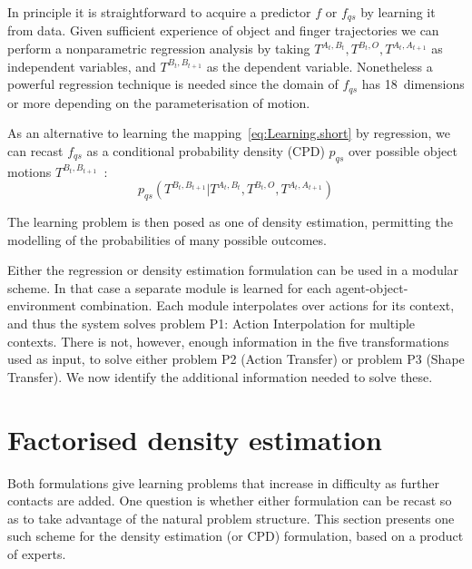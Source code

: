  In principle it is straightforward to acquire a predictor $f$ or
$f_{qs}$ by learning it from data. Given sufficient experience of
object and finger trajectories we can perform a nonparametric
regression analysis by taking $T^{A_t, B_t}, T^{B_t, O}, T^{A_{t},
  A_{t+1}}$ as independent variables, and $T^{B_{t}, B_{t+1}}$
as the dependent variable.  Nonetheless a powerful regression
technique is needed since the domain of $f_{qs}$ has 18~dimensions
or more depending on the parameterisation of motion.

 As an alternative to learning the mapping~\eqref{eq:Learning.short} by regression, we can recast $f_{qs}$ as a conditional probability density (CPD) $p_{qs}$ over possible object motions $T^{B_{t},B_{t+1}}$~\cite{kopicki_prediction_2009}:
\begin{equation}
p_{qs}(T^{B_{t}, B_{t+1}} | T^{A_t, B_t}, T^{B_t, O}, T^{A_{t}, A_{t+1}})
\label{eq:Learning.density1}
\end{equation}

The learning problem is then posed as one of density estimation, permitting the modelling of the probabilities of many possible outcomes. 

Either the regression or density estimation formulation can be used in a modular scheme. In that case a separate module is learned for each agent-object-environment combination. Each module interpolates over actions for its context, and thus the system solves problem P1: Action Interpolation for multiple contexts. There is not, however, enough information in the five transformations used as input, to solve either problem P2 (Action Transfer) or problem P3 (Shape Transfer). We now identify the additional information needed to solve these.



\section{Factorised density estimation}
\label{sec:Factors}

Both formulations give learning problems that increase in difficulty as further contacts are added. One question is whether either formulation can be recast so as to take advantage of the natural
problem structure. This section presents one such scheme for the
density estimation (or CPD) formulation, based on a product of experts.


